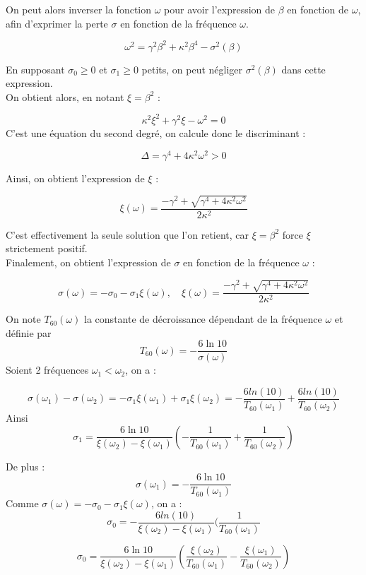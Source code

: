 \documentclass[a4,12pt]{article}
\begin{document}
  On peut alors inverser la fonction $\omega$ pour avoir l'expression de $\beta$ en fonction de $\omega$, afin d'exprimer la perte $\sigma$ en fonction de la fréquence $\omega$.

    \[
\omega^2 = \gamma^2 \beta^2 + \kappa^2 \beta^4 - \sigma^2(\beta)
    \]

    En supposant $\sigma_0\geqslant 0$ et $\sigma_1\geqslant 0$ petits, on peut négliger $\sigma^2(\beta)$ dans cette expression.\\
    On obtient alors, en notant $\xi = \beta^2$ :

    \[
    \kappa^2 \xi^2 + \gamma^2 \xi - \omega^2 = 0
    \]
    C'est une équation du second degré, on calcule donc le discriminant :

    \[
    \Delta = \gamma^4 + 4 \kappa^2 \omega^2 > 0
    \]

    Ainsi, on obtient l'expression de $\xi$ :

    \[
    \xi(\omega) = \frac{-\gamma^2+\sqrt{\gamma^4+4\kappa^2 \omega^2}}{2\kappa^2}
    \]

    C'est effectivement la seule solution que l'on retient, car $\xi = \beta^2$ force $\xi$ strictement positif.\\

    Finalement, on obtient l'expression de $\sigma$ en fonction de la fréquence $\omega$ :

    \[
    \sigma(\omega)=-\sigma_0-\sigma_1\xi (\omega),\quad \xi(\omega)=\frac{-\gamma^2+\sqrt{\gamma^4+4\kappa^2 \omega^2}}{2\kappa^2}
    \]

    On note $T_{60}(\omega)$ la constante de décroissance dépendant de la fréquence $\omega$ et définie par 
    \[
    T_{60}(\omega)=-\frac{6\ln 10}{\sigma(\omega)}
    \]
    Soient 2 fréquences $\omega_1<\omega_2$, on a :

    \[
\sigma(\omega_1)-\sigma(\omega_2) = -\sigma_1 \xi(\omega_1) + \sigma_1 \xi(\omega_2)
                                  = -\frac{6 ln(10)}{T_{60}(\omega_1)} + \frac{6 ln(10)}{T_{60}(\omega_2)}
    \]
   Ainsi \[
   \sigma_1=\frac{6 \ln 10}{\xi(\omega_2)-\xi(\omega_1)}\left(-\frac{1}{T_{60}(\omega_1)}+\frac{1}{T_{60}(\omega_2)}\right)
   \]

   De plus :
   \[
   \sigma(\omega_1)=-\frac{6\ln 10}{T_{60}(\omega_1)}
   \]
Comme $\sigma(\omega)=-\sigma_0-\sigma_1\xi (\omega)$, on a :
\[
\sigma_0 = - \frac{6 ln(10)}{\xi(\omega_2)-\xi(\omega_1)} (\frac{1}{T_{60}(\omega_1)}
\]

    \[
\sigma_0=\frac{6 \ln 10}{\xi(\omega_2)-\xi(\omega_1)}\left(\frac{\xi(\omega_2)}{T_{60}(\omega_1)}-\frac{\xi(\omega_1)}{T_{60}(\omega_2)}\right)
    \]
\end{document}
